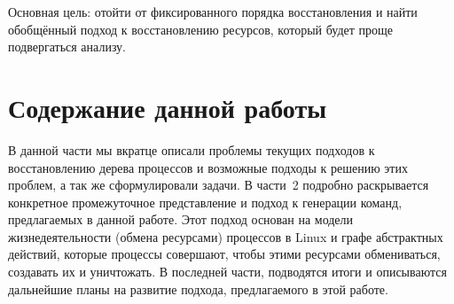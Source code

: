 Основная цель: отойти от фиксированного порядка восстановления и найти обобщённый подход к восстановлению ресурсов, который будет проще подвергаться анализу.


\section{Содержание данной работы}

В данной части мы вкратце описали проблемы текущих подходов к восстановлению дерева процессов и возможные подходы к решению этих проблем, а так же сформулировали задачи. В части~2 подробно раскрывается конкретное промежуточное представление и подход к генерации команд, предлагаемых в данной работе. Этот подход основан на модели жизнедеятельности (обмена ресурсами) процессов в Linux и графе абстрактных действий, которые процессы совершают, чтобы этими ресурсами обмениваться, создавать их и уничтожать. В последней части, подводятся итоги и описываются дальнейшие планы на развитие подхода, предлагаемого в этой работе.
